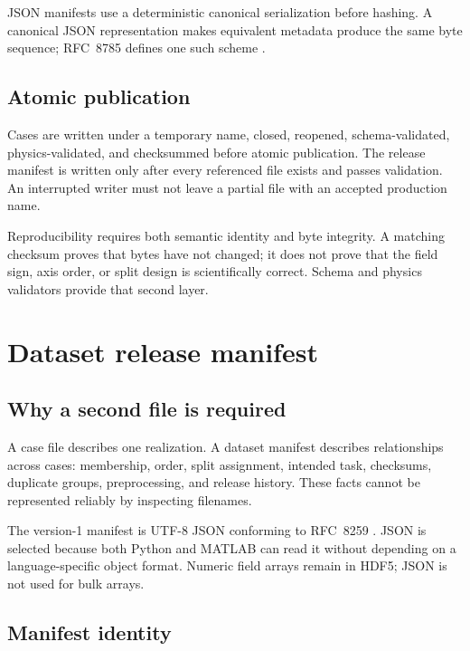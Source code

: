 \documentclass[11pt]{article}
\begin{document}
JSON manifests use a deterministic canonical serialization before hashing. A canonical JSON representation makes equivalent metadata produce the same byte sequence; RFC~8785 defines one such scheme \cite{JCS}.

\subsection{Atomic publication}

Cases are written under a temporary name, closed, reopened, schema-validated, physics-validated, and checksummed before atomic publication. The release manifest is written only after every referenced file exists and passes validation. An interrupted writer must not leave a partial file with an accepted production name.

\begin{resultbox}
Reproducibility requires both semantic identity and byte integrity. A matching checksum proves that bytes have not changed; it does not prove that the field sign, axis order, or split design is scientifically correct. Schema and physics validators provide that second layer.
\end{resultbox}

\section{Dataset release manifest}
\label{sec:manifest}

\subsection{Why a second file is required}

A case file describes one realization. A dataset manifest describes relationships across cases: membership, order, split assignment, intended task, checksums, duplicate groups, preprocessing, and release history. These facts cannot be represented reliably by inspecting filenames.

The version-1 manifest is UTF-8 JSON conforming to RFC~8259 \cite{RFC8259}. JSON is selected because both Python and MATLAB can read it without depending on a language-specific object format. Numeric field arrays remain in HDF5; JSON is not used for bulk arrays.

\subsection{Manifest identity}
\end{document}
